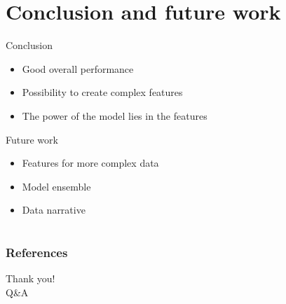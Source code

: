 \documentclass[10pt]{beamer}
\begin{document}
\section{Conclusion and future work}
\begin{frame}

  \begin{block}{Conclusion}
    \begin{itemize}
      \item Good overall performance
      \item Possibility to create complex features
      \item The power of the model lies in the features
    \end{itemize}
  \end{block}

  \begin{block}{Future work}
    \begin{itemize}
      \item Features for more complex data
      \item Model ensemble
      \item Data narrative
    \end{itemize}
  \end{block}

\end{frame}




\section*{}%
  \begin{frame}
    \frametitle{References}
    
    
  \end{frame}

  \begin{frame}[plain]
    \centering
    \Huge Thank you!\\
    \Huge Q\&A \par
  \end{frame}
\end{document}
